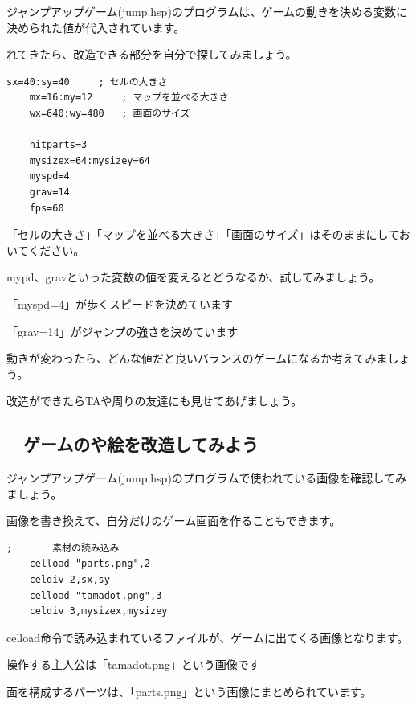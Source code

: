 \documentclass[text04.tex]{subfiles}
\begin{document}
\exampleinduction



ジャンプアップゲーム(jump.hsp)のプログラムは、ゲームの動きを決める変数に決められた値が代入されています。

れてきたら、改造できる部分を自分で探してみましょう。



\begin{lstlisting}[firstnumber=3,caption=jump.hspのプログラムの一部]
	sx=40:sy=40     ; セルの大きさ
	mx=16:my=12     ; マップを並べる大きさ
	wx=640:wy=480   ; 画面のサイズ

	hitparts=3
	mysizex=64:mysizey=64
	myspd=4
	grav=14
	fps=60
\end{lstlisting}


「セルの大きさ」「マップを並べる大きさ」「画面のサイズ」はそのままにしておいてください。

mypd、gravといった変数の値を変えるとどうなるか、試してみましょう。

\exampleanswer

「myspd=4」が歩くスピードを決めています

「grav=14」がジャンプの強さを決めています

動きが変わったら、どんな値だと良いバランスのゲームになるか考えてみましょう。

改造ができたらTAや周りの友達にも見せてあげましょう。


\newpage
\subsection{\useOmetoiExample　ゲームのや絵を改造してみよう}


\exampleinduction

ジャンプアップゲーム(jump.hsp)のプログラムで使われている画像を確認してみましょう。

画像を書き換えて、自分だけのゲーム画面を作ることもできます。

\begin{lstlisting}[firstnumber=15,caption=jump.hspのプログラムの一部]
	;       素材の読み込み
	celload "parts.png",2
	celdiv 2,sx,sy
	celload "tamadot.png",3
	celdiv 3,mysizex,mysizey
\end{lstlisting}

celload命令で読み込まれているファイルが、ゲームに出てくる画像となります。

操作する主人公は「tamadot.png」という画像です

面を構成するパーツは、「parts.png」という画像にまとめられています。
\end{document}
